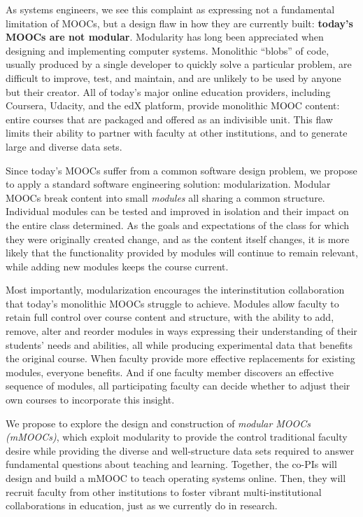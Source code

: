 As systems engineers, we see this complaint as expressing not a fundamental
limitation of MOOCs, but a design flaw in how they are currently built:
\textbf{today's MOOCs are not modular}. Modularity has long been appreciated
when designing and implementing computer systems. Monolithic ``blobs'' of
code, usually produced by a single developer to quickly solve a particular
problem, are difficult to improve, test, and maintain, and are unlikely to be
used by anyone but their creator. All of today's major online education
providers, including Coursera, Udacity, and the edX platform, provide
monolithic MOOC content: entire courses that are packaged and offered as an
indivisible unit. This flaw limits their ability to partner with faculty at
other institutions, and to generate large and diverse data sets.

Since today's MOOCs suffer from a common software design problem, we propose
to apply a standard software engineering solution: modularization. Modular
MOOCs break content into small \textit{modules} all sharing a common
structure. Individual modules can be tested and improved in isolation and
their impact on the entire class determined. As the goals and expectations of
the class for which they were originally created change, and as the content
itself changes, it is more likely that the functionality provided by modules
will continue to remain relevant, while adding new modules keeps the course
current.

Most importantly, modularization encourages the interinstitution
collaboration that today's monolithic MOOCs struggle to achieve. Modules
allow faculty to retain full control over course content and structure, with
the ability to add, remove, alter and reorder modules in ways expressing
their understanding of their students' needs and abilities, all while
producing experimental data that benefits the original course. When faculty
provide more effective replacements for existing modules, everyone benefits.
And if one faculty member discovers an effective sequence of modules, all
participating faculty can decide whether to adjust their own courses to
incorporate this insight.

We propose to explore the design and construction of \textit{modular MOOCs
(mMOOCs)}, which exploit modularity to provide the control traditional
faculty desire while providing the diverse and well-structure data sets
required to answer fundamental questions about teaching and learning.
Together, the co-PIs will design and build a mMOOC to teach operating systems
online. Then, they will recruit faculty from other institutions to foster
vibrant multi-institutional collaborations in education, just as we currently
do in research.


